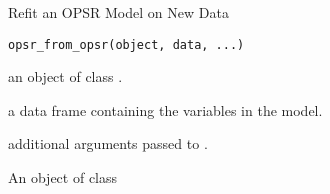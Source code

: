 
%
\begin{Description}
Refit an OPSR Model on New Data
\end{Description}
%
\begin{Usage}
\begin{verbatim}
opsr_from_opsr(object, data, ...)
\end{verbatim}
\end{Usage}
%
\begin{Arguments}
\begin{ldescription}
\item[\code{object}] an object of class .

\item[\code{data}] a data frame containing the variables in the model.

\item[\code{...}] additional arguments passed to .
\end{ldescription}
\end{Arguments}
%
\begin{Value}
An object of class 
\end{Value}


